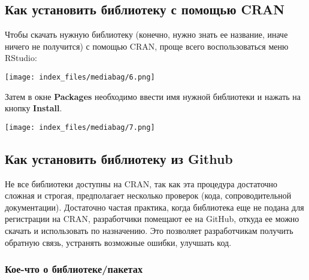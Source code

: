\documentclass[
  letterpaper,
  DIV=11,
  numbers=noendperiod]{scrreprt}
\begin{document}
\hypertarget{ux43aux430ux43a-ux443ux441ux442ux430ux43dux43eux432ux438ux442ux44c-ux431ux438ux431ux43bux438ux43eux442ux435ux43aux443-ux441-ux43fux43eux43cux43eux449ux44cux44e-cran}{%
\subsection{Как установить библиотеку с помощью
CRAN}\label{ux43aux430ux43a-ux443ux441ux442ux430ux43dux43eux432ux438ux442ux44c-ux431ux438ux431ux43bux438ux43eux442ux435ux43aux443-ux441-ux43fux43eux43cux43eux449ux44cux44e-cran}}

Чтобы скачать нужную библиотеку (конечно, нужно знать ее название, иначе
ничего не получится) с помощью CRAN, проще всего воспользоваться меню
RStudio:

\texttt{[image: index\_files/mediabag/6.png]}

Затем в окне \textbf{Packages} необходимо ввести имя нужной библиотеки и
нажать на кнопку \textbf{Install}.

\texttt{[image: index\_files/mediabag/7.png]}

\hypertarget{ux43aux430ux43a-ux443ux441ux442ux430ux43dux43eux432ux438ux442ux44c-ux431ux438ux431ux43bux438ux43eux442ux435ux43aux443-ux438ux437-github}{%
\subsection{Как установить библиотеку из
Github}\label{ux43aux430ux43a-ux443ux441ux442ux430ux43dux43eux432ux438ux442ux44c-ux431ux438ux431ux43bux438ux43eux442ux435ux43aux443-ux438ux437-github}}

Не все библиотеки доступны на CRAN, так как эта процедура достаточно
сложная и строгая, предполагает несколько проверок (кода,
сопроводительной документации). Достаточно частая практика, когда
библиотека еще не подана для регистрации на CRAN, разработчики помещают
ее на GitHub, откуда ее можно скачать и использовать по назначению. Это
позволяет разработчикам получить обратную связь, устранять возможные
ошибки, улучшать код.

\hypertarget{ux43aux43eux435-ux447ux442ux43e-ux43e-ux431ux438ux431ux43bux438ux43eux442ux435ux43aux435ux43fux430ux43aux435ux442ux430ux445}{%
\subsubsection{Кое-что о
библиотеке/пакетах}\label{ux43aux43eux435-ux447ux442ux43e-ux43e-ux431ux438ux431ux43bux438ux43eux442ux435ux43aux435ux43fux430ux43aux435ux442ux430ux445}}
\end{document}
